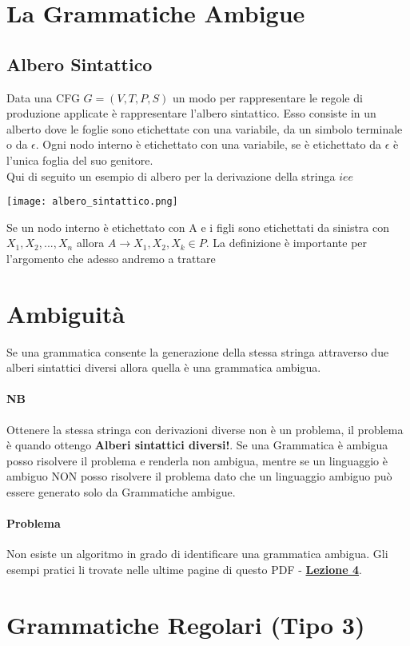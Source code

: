 \documentclass[12pt, a4paper, openany]{book}
\begin{document}
\section{La Grammatiche Ambigue}
\subsection{Albero Sintattico}
Data una CFG $G= (V,T,P,S)$ un modo per rappresentare le regole di produzione applicate è rappresentare l'albero sintattico.
Esso consiste in un alberto dove le foglie sono etichettate con una variabile, da un simbolo
terminale o da $\epsilon$. Ogni nodo interno è etichettato con una variabile, 
se è etichettato da $\epsilon$ è l'unica foglia del suo genitore.
\\ Qui di seguito un esempio di albero per la derivazione della stringa $iee$
\begin{center}
    \texttt{[image: albero\_sintattico.png]}
\end{center}
Se un nodo interno è etichettato con A e i figli sono etichettati da sinistra
con $X_1, X_2, ..., X_n$ allora $A \rightarrow X_1, X_2, X_k \in P$.
La definizione è importante per l'argomento che adesso andremo a trattare
\section*{Ambiguità}
Se una grammatica consente la generazione della stessa stringa attraverso due alberi sintattici
diversi allora quella è una grammatica ambigua.
\paragraph*{NB} Ottenere la stessa stringa con derivazioni diverse non è un problema,
il problema è quando ottengo \textbf{Alberi sintattici diversi!}.
Se una Grammatica è ambigua posso risolvere il problema e renderla non ambigua, mentre
se un linguaggio è ambiguo NON posso risolvere il problema dato che
un linguaggio ambiguo può essere generato solo da Grammatiche ambigue.
\paragraph*{Problema} Non esiste un algoritmo in grado di identificare una grammatica
ambigua. Gli esempi pratici li trovate nelle ultime pagine di questo PDF - 
{\href{https://drive.google.com/drive/folders/1gdH43dnEfCeLGmq08HEBwQoKORGgcQdY}{\textbf{Lezione 4}}}.
\section{Grammatiche Regolari (Tipo 3)}
\end{document}

